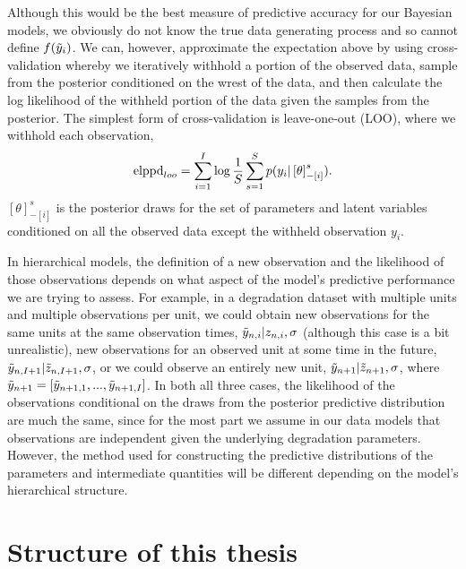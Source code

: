 Although this would be the best measure of predictive accuracy for our Bayesian models, we obviously do not know the true data generating process and so cannot define $f(\Tilde{y}_i)$. We can, however, approximate the expectation above by using cross-validation whereby we iteratively withhold a portion of the observed data, sample from the posterior conditioned on the wrest of the data, and then calculate the log likelihood of the withheld portion of the data given the samples from the posterior. The simplest form of cross-validation is leave-one-out (LOO), where we withhold each observation,
\begin{equation} \label{ep:elppd_loo}
   \hbox{elppd}_{loo} = \sum^I_{i = 1} \log \frac{1}{S} \sum^S_{s = 1} p(y_i|\left[\theta\right]_{-\left[i\right]}^s).
\end{equation}
$\left[\theta\right]_{-\left[i\right]}^s$ is the posterior draws for the set of parameters and latent variables conditioned on all the observed data except the withheld observation $y_i$.

In hierarchical models, the definition of a new observation and the likelihood of those observations depends on what aspect of the model's predictive performance we are trying to assess. For example, in a degradation dataset with multiple units and multiple observations per unit, we could obtain new observations for the same units at the same observation times, $\Tilde{y}_{n,i} | z_{n, i}, \sigma$ (although this case is a bit unrealistic), new observations for an observed unit at some time in the future, $\Tilde{y}_{n, I + 1}|\Tilde{z}_{n, I + 1}, \sigma$, or we could observe an entirely new unit, $\Tilde{y}_{n + 1}|\Tilde{z}_{n + 1}, \sigma$, where $\Tilde{y}_{n + 1} = \left[\Tilde{y}_{n + 1, 1}, ..., \Tilde{y}_{n + 1, I}\right]$. In both all three cases, the likelihood of the observations conditional on the draws from the posterior predictive distribution are much the same, since for the most part we assume in our data models that observations are independent given the underlying degradation parameters. However, the method used for constructing the predictive distributions of the parameters and intermediate quantities will be different depending on the model's hierarchical structure.

\section{Structure of this thesis}
\label{sec:thesis-structure}

